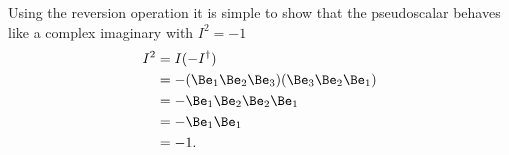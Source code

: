 %
%
Using the reversion operation it is simple to show that the  pseudoscalar
behaves like a complex imaginary with \( I^2 = -1 \)
\begin{equation}\label{eqn:R3PseudoscalarSquare:3310}
\begin{aligned}
I^2
&= I (-I^\dagger)  \\
&= - (\Be_1 \Be_2 \Be_3)(\Be_3 \Be_2 \Be_1) \\
&= - \Be_1 \Be_2 \Be_2 \Be_1 \\
&= - \Be_1 \Be_1 \\
&= -1.
\end{aligned}
\end{equation}
